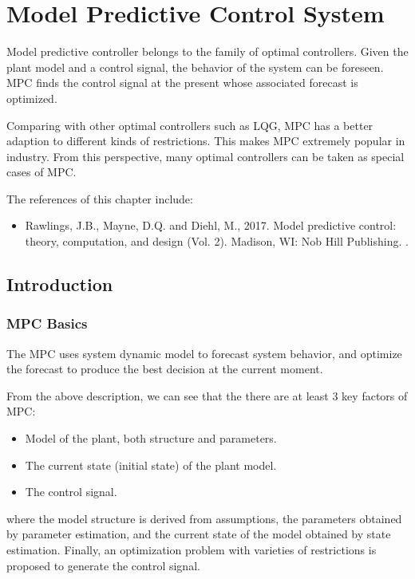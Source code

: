 \chapter{Model Predictive Control System} \label{ch:mpcs}

Model predictive controller belongs to the family of optimal controllers. Given the plant model and a control signal, the behavior of the system can be foreseen. MPC finds the control signal at the present whose associated forecast is optimized.

Comparing with other optimal controllers such as LQG, MPC has a better adaption to different kinds of restrictions. This makes MPC extremely popular in industry. From this perspective, many optimal controllers can be taken as special cases of MPC.

The references of this chapter include:
\begin{itemize}
	\item Rawlings, J.B., Mayne, D.Q. and Diehl, M., 2017. Model predictive control: theory, computation, and design (Vol. 2). Madison, WI: Nob Hill Publishing. \cite{rawlings2017model}.
\end{itemize}

\section{Introduction}

\subsection{MPC Basics}

The MPC uses system dynamic model to forecast system behavior, and optimize the forecast to produce the best decision at the current moment.

From the above description, we can see that the there are at least 3 key factors of MPC:
\begin{itemize}
	\item Model of the plant, both structure and parameters.
	\item The current state (initial state) of the plant model.
	\item The control signal.
\end{itemize}
where the model structure is derived from assumptions, the parameters obtained by parameter estimation, and the current state of the model obtained by state estimation. Finally, an optimization problem with varieties of restrictions is proposed to generate the control signal.

